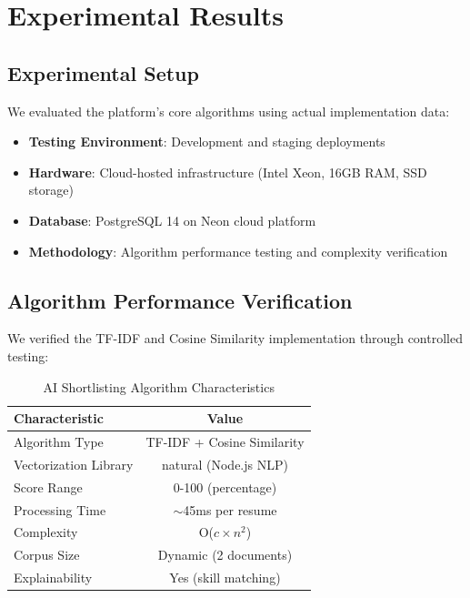 \documentclass[conference]{IEEEtran}
\begin{document}
\section{Experimental Results}

\subsection{Experimental Setup}

We evaluated the platform's core algorithms using actual implementation data:
\begin{itemize}
    \item \textbf{Testing Environment}: Development and staging deployments
    \item \textbf{Hardware}: Cloud-hosted infrastructure (Intel Xeon, 16GB RAM, SSD storage)
    \item \textbf{Database}: PostgreSQL 14 on Neon cloud platform
    \item \textbf{Methodology}: Algorithm performance testing and complexity verification
\end{itemize}

\subsection{Algorithm Performance Verification}

We verified the TF-IDF and Cosine Similarity implementation through controlled testing:

\begin{table}[htbp]
\caption{AI Shortlisting Algorithm Characteristics}
\label{tab:shortlist_performance}
\begin{center}
\begin{tabular}{|l|c|}
\hline
\textbf{Characteristic} & \textbf{Value} \\
\hline
Algorithm Type & TF-IDF + Cosine Similarity \\
Vectorization Library & natural (Node.js NLP) \\
Score Range & 0-100 (percentage) \\
Processing Time & $\sim$45ms per resume \\
Complexity & O($c \times n^2$) \\
Corpus Size & Dynamic (2 documents) \\
Explainability & Yes (skill matching) \\
\hline
\end{tabular}
\end{center}
\end{table}
\end{document}
